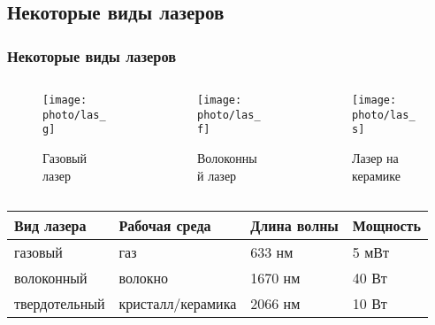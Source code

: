 \documentclass[10pt,pdf,hyperref={unicode}, dvipsnames]{beamer}
\newcommand\frametitless[1]{\subsection{#1}\frametitle{#1}}
\begin{document}
\begin{frame}[t]
	\frametitless{Некоторые виды лазеров}
	\vspace{-1em}

	\begin{columns}
		\begin{column}{0.3\textwidth}
			\begin{figure}[h]
				\centering
				\texttt{[image: photo/las\_g]}
				\caption{Газовый лазер}
			\end{figure}	
		\end{column}
		\begin{column}{0.3\textwidth}
			\begin{figure}[h]
				\centering
				\texttt{[image: photo/las\_f]}
				\caption{Волоконный лазер}
			\end{figure}	
		\end{column}
		\begin{column}{0.3\textwidth}
			\begin{figure}[h]
				\centering
				\texttt{[image: photo/las\_s]}
				\caption{Лазер на керамике}
			\end{figure}	
		\end{column}		
	\end{columns}
	\begin{center}
  \begin{tabular}{*{4}{l}}
    \toprule
    Вид лазера & Рабочая среда & Длина волны & Мощность \\
    \midrule
    газовый & газ & 633 нм & 5  мВт\\
    волоконный & волокно & 1670 нм & 40 Вт\\
    твердотельный & кристалл/керамика & 2066 нм & 10 Вт\\
    \bottomrule
  \end{tabular}		
	\end{center}
\end{frame}
\end{document}
